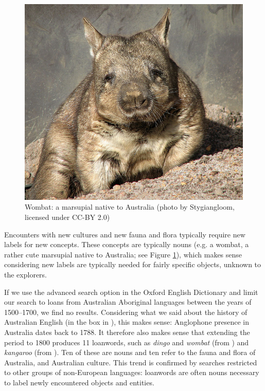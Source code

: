 \sloppy
\begin{figure}
        \includegraphics[scale=0.5]{chapters/img/668px-Wombat_1.jpg}
    \caption{Wombat: a marsupial native to Australia (photo by Stygiangloom, licensed under CC-BY 2.0)}
    \label{fig:Wombat}
\end{figure}

Encounters with new cultures and new fauna and flora typically require new labels for new concepts. These concepts are typically nouns (e.g. a wombat, a rather cute marsupial native to Australia; see Figure \ref{fig:Wombat}), which makes sense considering new labels are typically needed for fairly specific objects, unknown to the explorers.

If we use the advanced search option in the Oxford English Dictionary and limit our search to loans from Australian Aboriginal languages between the years of 1500--1700, we find no results. Considering what we said about the history of Australian English (in the box in ), this makes sense: Anglophone presence in Australia dates back to 1788. It therefore also makes sense that extending the period to 1800 produces 11 loanwords, such as \textit{dingo} and \textit{wombat} (from ) and \textit{kangaroo} (from ). Ten of these are nouns and ten refer to the fauna and flora of Australia, and Australian culture. This trend is confirmed by searches restricted to other groups of non-European languages: loanwords are often nouns necessary to label newly encountered objects and entities.

